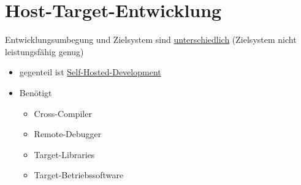 \section{Host-Target-Entwicklung}
Entwicklungsumbegung und Zielsystem sind \underline{unterschiedlich} (Zielsystem nicht leistungsfähig genug)

\begin{itemize}

	\item gegenteil ist \underline{Self-Hosted-Development}
	
	\item Benötigt
	\begin{itemize}
		\item Cross-Compiler
		\item Remote-Debugger
		\item Target-Libraries
		\item Target-Betriebssoftware
	\end{itemize}

\end{itemize}